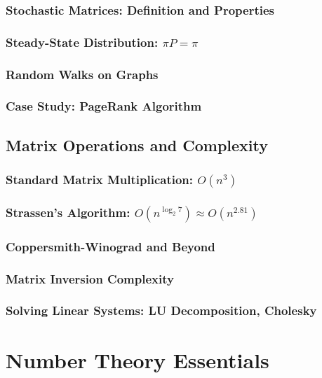 \subsubsection{Stochastic Matrices: Definition and Properties}
\subsubsection{Steady-State Distribution: $\pi P = \pi$}
\subsubsection{Random Walks on Graphs}
\subsubsection{Case Study: PageRank Algorithm}

\subsection{Matrix Operations and Complexity}
\label{subsec:matrix-complexity}

\subsubsection{Standard Matrix Multiplication: $O(n^3)$}
\subsubsection{Strassen's Algorithm: $O(n^{\log_2 7}) \approx O(n^{2.81})$}
\subsubsection{Coppersmith-Winograd and Beyond}
\subsubsection{Matrix Inversion Complexity}
\subsubsection{Solving Linear Systems: LU Decomposition, Cholesky}

\section{Number Theory Essentials}
\label{sec:number-theory}

